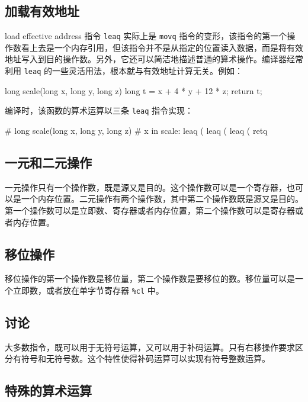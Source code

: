 \subsection{加载有效地址}

load effective address 指令 \verb|leaq| 实际上是 \verb|movq| 指令的变形，该指令的第一个操作数看上去是一个内存引用，但该指令并不是从指定的位置读入数据，而是将有效地址写入到目的操作数。另外，它还可以简洁地描述普通的算术操作。编译器经常利用 \verb|leaq| 的一些灵活用法，根本就与有效地址计算无关。例如：

\begin{cppcode}
long scale(long x, long y, long z) {
  long t = x + 4 * y + 12 * z;
  return t;
}
\end{cppcode}

编译时，该函数的算术运算以三条 \verb|leaq| 指令实现：

\begin{gascode}
# long scale(long x, long y, long z)
# x in %
scale:
    leaq    (%
    leaq    (%
    leaq    (%
    retq
\end{gascode}

\subsection{一元和二元操作}

一元操作只有一个操作数，既是源又是目的。这个操作数可以是一个寄存器，也可以是一个内存位置。二元操作有两个操作数，其中第二个操作数既是源又是目的。第一个操作数可以是立即数、寄存器或者内存位置，第二个操作数可以是寄存器或者内存位置。

\subsection{移位操作}

移位操作的第一个操作数是移位量，第二个操作数是要移位的数。移位量可以是一个立即数，或者放在单字节寄存器 \verb|%cl| 中。

\subsection{讨论}

大多数指令，既可以用于无符号运算，又可以用于补码运算。只有右移操作要求区分有符号和无符号数。这个特性使得补码运算可以实现有符号整数运算。

\subsection{特殊的算术运算}

